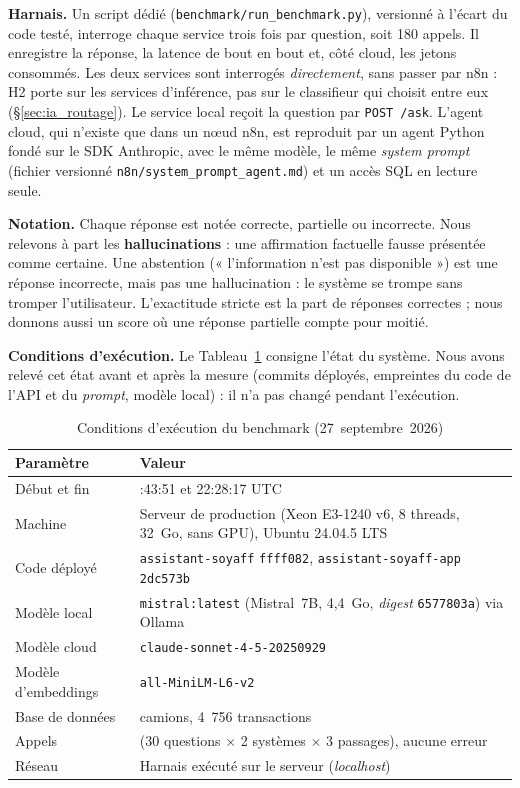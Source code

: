 \textbf{Harnais.} Un script dédié (\texttt{benchmark/run\_benchmark.py}), versionné à l'écart du code testé, interroge chaque service trois fois par question, soit 180 appels. Il enregistre la réponse, la latence de bout en bout et, côté cloud, les jetons consommés. Les deux services sont interrogés \emph{directement}, sans passer par n8n : H2 porte sur les services d'inférence, pas sur le classifieur qui choisit entre eux (\S\ref{sec:ia_routage}). Le service local reçoit la question par \texttt{POST~/ask}. L'agent cloud, qui n'existe que dans un nœud n8n, est reproduit par un agent Python fondé sur le SDK Anthropic, avec le même modèle, le même \textit{system prompt} (fichier versionné \texttt{n8n/system\_prompt\_agent.md}) et un accès SQL en lecture seule.

\textbf{Notation.} Chaque réponse est notée correcte, partielle ou incorrecte. Nous relevons à part les \textbf{hallucinations} : une affirmation factuelle fausse présentée comme certaine. Une abstention (« l'information n'est pas disponible ») est une réponse incorrecte, mais pas une hallucination : le système se trompe sans tromper l'utilisateur. L'exactitude stricte est la part de réponses correctes ; nous donnons aussi un score où une réponse partielle compte pour moitié.

\textbf{Conditions d'exécution.} Le Tableau~\ref{tab:bench_metadata} consigne l'état du système. Nous avons relevé cet état avant et après la mesure (commits déployés, empreintes du code de l'API et du \textit{prompt}, modèle local) : il n'a pas changé pendant l'exécution.

\begin{table}[htbp]
\centering
\footnotesize
\caption{Conditions d'exécution du benchmark (27~septembre~2026)}
\label{tab:bench_metadata}
\begin{tabular}{|>{\raggedright\arraybackslash}p{4.6cm}|>{\raggedright\arraybackslash}p{8.6cm}|}
\hline
\rowcolor[HTML]{EFEFEF}
\textbf{Paramètre} & \textbf{Valeur} \\ \hline
Début et fin & 21:43:51 et 22:28:17 UTC \\ \hline
Machine & Serveur de production (Xeon E3-1240 v6, 8 threads, 32~Go, sans GPU), Ubuntu 24.04.5 LTS \\ \hline
Code déployé & \texttt{assistant-soyaff} \texttt{ffff082}, \texttt{assistant-soyaff-app} \texttt{2dc573b} \\ \hline
Modèle local & \texttt{mistral:latest} (Mistral~7B, 4,4~Go, \textit{digest} \texttt{6577803a}) via Ollama \\ \hline
Modèle cloud & \texttt{claude-sonnet-4-5-20250929} \\ \hline
Modèle d'embeddings & \texttt{all-MiniLM-L6-v2} \\ \hline
Base de données & 317 camions, 4~756 transactions \\ \hline
Appels & 180 (30 questions $\times$ 2 systèmes $\times$ 3 passages), aucune erreur \\ \hline
Réseau & Harnais exécuté sur le serveur (\textit{localhost}) \\ \hline
\end{tabular}
\end{table}

